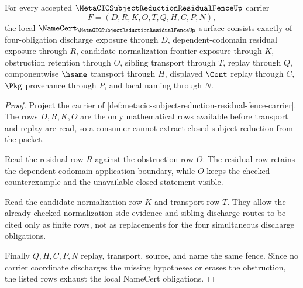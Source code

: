 \begin{theorem}
\label{thm:metacic-subject-reduction-residual-fence-namecert-obligations}
For every accepted $\MetaCICSubjectReductionResidualFenceUp$ carrier
$$
F=(D,R,K,O,T,Q,H,C,P,N),
$$
the local $\NameCert_{\MetaCICSubjectReductionResidualFenceUp}$ surface consists exactly of four-obligation discharge exposure through $D$, dependent-codomain residual exposure through $R$, candidate-normalization frontier exposure through $K$, obstruction retention through $O$, sibling transport through $T$, replay through $Q$, componentwise $\hsame$ transport through $H$, displayed $\Cont$ replay through $C$, $\Pkg$ provenance through $P$, and local naming through $N$.
\end{theorem}
\begin{proof}
Project the carrier of \autoref{def:metacic-subject-reduction-residual-fence-carrier}. The rows $D,R,K,O$ are the only mathematical rows available before transport and replay are read, so a consumer cannot extract closed subject reduction from the packet.

Read the residual row $R$ against the obstruction row $O$. The residual row retains the dependent-codomain application boundary, while $O$ keeps the checked counterexample and the unavailable closed statement visible.

Read the candidate-normalization row $K$ and transport row $T$. They allow the already checked normalization-side evidence and sibling discharge routes to be cited only as finite rows, not as replacements for the four simultaneous discharge obligations.

Finally $Q,H,C,P,N$ replay, transport, source, and name the same fence. Since no carrier coordinate discharges the missing hypotheses or erases the obstruction, the listed rows exhaust the local NameCert obligations.
\end{proof}

